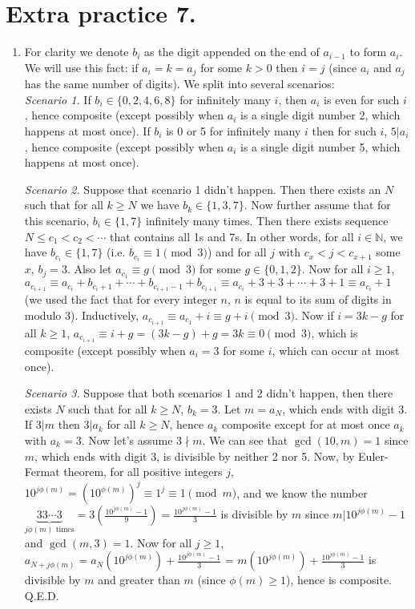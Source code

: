 \documentclass[11pt]{article}
\begin{document}
\section {Extra practice 7.}
\begin{enumerate}
\item For clarity we denote $b_i$ as the digit appended on the end of $a_{i-1}$ to form $a_i$. We will use this fact: if $a_i=k=a_j$ for some $k>0$ then $i=j$ (since $a_i$ and $a_j$ has the same number of digits). We split into several scenarios:\\
\emph{Scenario 1.} If $b_i\in\{0,2,4,6,8\}$ for infinitely many $i$, then $a_i$ is even for such $i$, hence composite (except possibly when $a_i$ is a single digit number 2, which happens at most once). If $b_i$ is 0 or 5 for infinitely many $i$ then for such $i$, $5|a_i$, hence composite (except possibly when $a_i$ is a single digit number 5, which happens at most once).

\emph {Scenario 2.} Suppose that scenario 1 didn't happen. Then there exists an $N$ such that for all $k\ge N$ we have $b_k\in\{1,3,7\}$. Now further assume that for this scenario, $b_i\in\{1,7\}$ infinitely many times. Then there exists sequence $N\le c_1<c_2<\cdots$ that contains all 1s and 7s. In other words, for all $i\in\mathbb{N}$, we have $b_{c_i}\in\{1,7\}$ (i.e. $b_{c_i}\equiv 1\pmod {3}$) and for all $j$ with $c_x<j<c_{x+1}$ some $x$, $b_j=3$. Also let $a_{c_1}\equiv g\pmod {3}$ for some $g\in\{0,1,2\}$. Now for all $i\ge 1$, $a_{c_{i+1}}\equiv a_{c_{i}}+b_{c_{i}+1}+\cdots + b_{c_{i+1}-1} + b_{c_{i+1}}\equiv a_{c_i}+3+3+\cdots +3+1\equiv a_{c_i}+1$ (we used the fact that for every integer $n$, $n$ is equal to its sum of digits in modulo 3). Inductively, $a_{c_{i+1}}\equiv a_{c_1}+i\equiv g+i\pmod {3}.$ Now if $i=3k-g$ for all $k\ge 1$, $a_{c_{i+1}}\equiv i+g=(3k-g)+g=3k\equiv 0\pmod{3}$, which is composite (except possibly when $a_i=3$ for some $i$, which can occur at most once).

\emph {Scenario 3.} Suppose that both scenarios 1 and 2 didn't happen, then there exists $N$ such that for all $k\ge N$, $b_k=3$. Let $m=a_N$, which ends with digit 3. If $3|m$ then $3|a_k$ for all $k\ge N$, hence $a_k$ composite except for at most once $a_k$ with $a_k=3$. Now let's assume $3\nmid m$. We can see that $\gcd (10, m)=1$ since $m$, which ends with digit 3, is divisible by neither 2 nor 5. Now, by Euler-Fermat theorem, for all positive integers $j$, $10^{j\phi(m)}=(10^{\phi (m)})^j\equiv 1^j\equiv 1\pmod {m}$, and we know the number $\underbrace{33\cdots 3}_{j\phi(m)\text{ times}}=3(\frac{10^{j\phi(m)}-1}{9})=\frac{10^{j\phi(m)}-1}{3}$  is divisible by $m$ since $m|10^{j\phi(m)}-1$ and $\gcd (m,3)=1$. Now for all $j\ge 1$, $a_{N+j\phi(m)}=a_N(10^{j\phi(m)})+\frac{10^{j\phi(m)}-1}{3}$ = $m(10^{j\phi(m)})+\frac{10^{j\phi(m)}-1}{3}$ is divisible by $m$ and greater than $m$ (since $\phi (m)\ge 1$), hence is composite. Q.E.D.


\end{enumerate}
\end{document}
